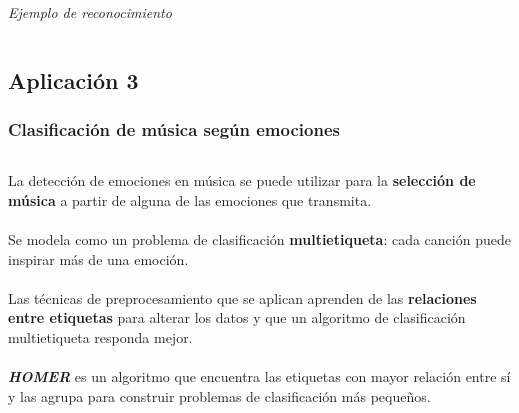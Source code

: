 \documentclass[8pt]{beamer}
\begin{document}
\begin{frame}
\begin{columns}[T]
\begin{column}{.5\textwidth}
\begin{center}
	  \\ \centering \textit{Ejemplo de reconocimiento}
	  \end{center}
       \end{column}
      \end{columns}
    \end{frame}


\subsection{Aplicación 3}
  \begin{frame}
	\frametitle{Clasificación de música según emociones}
	\begin{columns}[T]
		\begin{column}{.5\textwidth}
			La detección de emociones en música se puede utilizar para la 
			\textbf{selección de música} a partir de alguna de las emociones que transmita.
			\\~\\
			Se modela como un problema de clasificación \textbf{multietiqueta}:
			cada canción puede inspirar más de una emoción.
			\\~\\
			Las técnicas de preprocesamiento que se aplican aprenden de las
			\textbf{relaciones entre etiquetas} para alterar los datos y que
			un algoritmo de clasificación multietiqueta responda mejor.
			\\~\\
			\textbf{\textit{HOMER}} es un algoritmo que encuentra las etiquetas con mayor
			relación entre sí y las agrupa para construir problemas de clasificación
			más pequeños.
			

\end{column}
\end{columns}
\end{frame}
\end{document}
